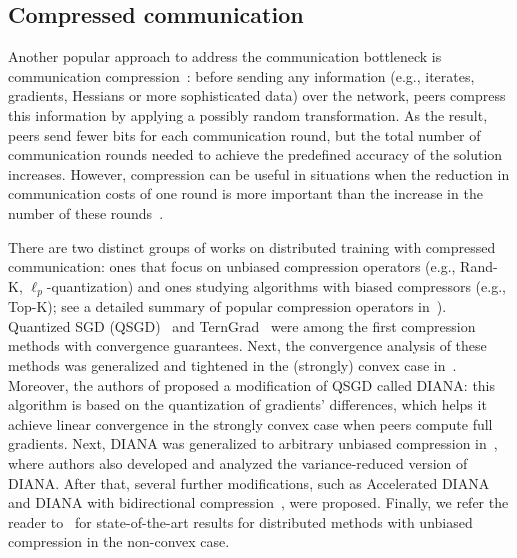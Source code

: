 \subsection{Compressed communication}
Another popular approach to address the communication bottleneck is communication compression~\cite{seide20141,alistarh2017qsgd,suresh2017distributed, ramezani2021nuqsgd, faghri2020adaptive}: before sending any information (e.g., iterates, gradients, Hessians or more sophisticated data) over the network, peers compress this information by applying a possibly random transformation. As the result, peers send fewer bits for each communication round, but the total number of communication rounds needed to achieve the predefined accuracy of the solution increases. However, compression can be useful in situations when the reduction in communication costs of one round is more important than the increase in the number of these rounds~\cite{horvath2019natural}.

There are two distinct groups of works on distributed training with compressed communication: ones that focus on unbiased compression operators (e.g., Rand-K, $\ell_p$-quantization) and ones studying algorithms with biased compressors (e.g., Top-K); see a detailed summary of  popular compression operators in~\cite{beznosikov2020biased}). 
Quantized SGD (QSGD)~\cite{alistarh2017qsgd} and TernGrad~\cite{wen2017terngrad} were among the first compression methods with convergence guarantees. Next, the convergence analysis of these methods was generalized and tightened in the (strongly) convex case in~\cite{mishchenko2019distributed}. Moreover, the authors of \cite{mishchenko2019distributed} proposed a modification of QSGD called DIANA: this algorithm is based on the quantization of gradients' differences, which helps it achieve linear convergence in the strongly convex case when peers compute full gradients. Next, DIANA was generalized to arbitrary unbiased compression in~\cite{horvath2019stochastic}, where authors also developed and analyzed the variance-reduced version of DIANA. After that, several further modifications, such as Accelerated DIANA~\cite{li2020acceleration} and DIANA with bidirectional compression~\cite{gorbunov2020linearly,philippenko2020artemis}, were proposed. Finally, we refer the reader to~\cite{li2020unified,haddadpour2020federated,das2020improved, pmlr-v139-gorbunov21a} for state-of-the-art results for distributed methods with unbiased compression in the non-convex case.

